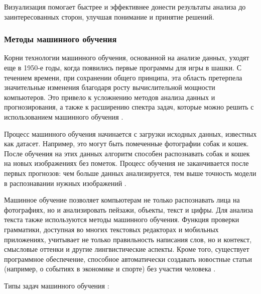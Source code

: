 Визуализация помогает быстрее и эффективнее донести результаты анализа до заинтересованных сторон, улучшая понимание и принятие решений.

\subsubsection{Методы машинного обучения}

Корни технологии машинного обучения, основанной на анализе данных, уходят еще в 1950-е годы, когда появились первые программы для игры в шашки. С течением времени, при сохранении общего принципа, эта область претерпела значительные изменения благодаря росту вычислительной мощности компьютеров. Это привело к усложнению методов анализа данных и прогнозирования, а также к расширению спектра задач, которые можно решить с использованием машинного обучения .

Процесс машинного обучения начинается с загрузки исходных данных, известных как датасет. Например, это могут быть помеченные фотографии собак и кошек. После обучения на этих данных алгоритм способен распознавать собак и кошек на новых изображениях без пометок. Процесс обучения не заканчивается после первых прогнозов: чем больше данных анализируется, тем выше точность модели в распознавании нужных изображений .

Машинное обучение позволяет компьютерам не только распознавать лица на фотографиях, но и анализировать пейзажи, объекты, текст и цифры. Для анализа текста также используются методы машинного обучения. Функция проверки грамматики, доступная во многих текстовых редакторах и мобильных приложениях, учитывает не только правильность написания слов, но и контекст, смысловые оттенки и другие лингвистические аспекты. Кроме того, существует программное обеспечение, способное автоматически создавать новостные статьи (например, о событиях в экономике и спорте) без участия человека .

Типы задач машинного обучения :

